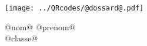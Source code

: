\Huge

\begin{block} %
{}\hfill {}



\vspace{1cm}


\begin{minipage}{0.3\linewidth}
\texttt{[image: ../QRcodes/@dossard@.pdf]}
\end{minipage}
{}\hfill {}
\begin{minipage}{0.33\linewidth}
{}\hfill {}
{}\hfill {}


\begin{center}
	@nom@ @prenom@\\
	@classe@
\end{center}

	


\end{minipage}
\end{block}
